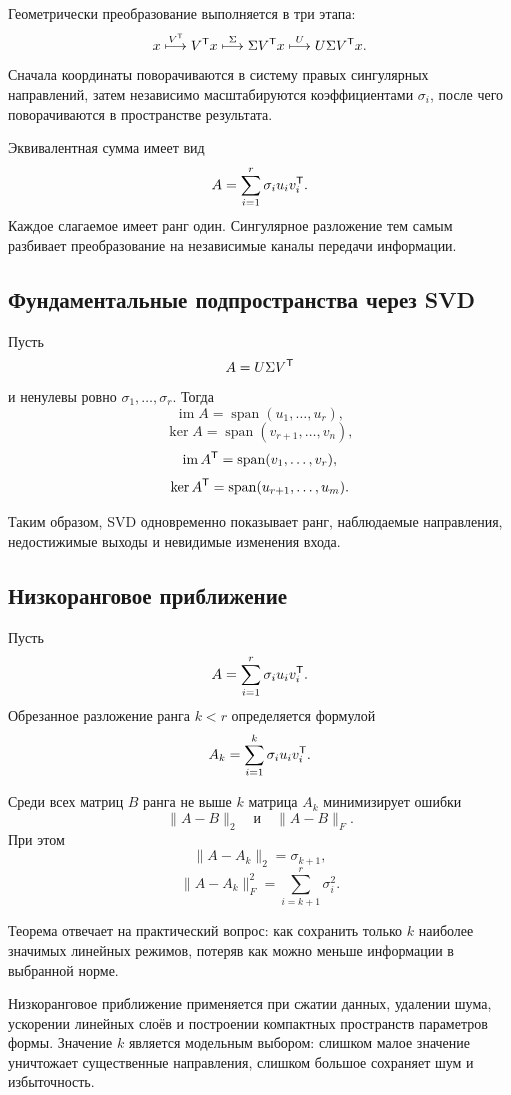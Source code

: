 Геометрически преобразование выполняется в три этапа:
\[
x
\overset{V^{\mathsf{T}}}{\longmapsto}
V^{\mathsf{T}}x
\overset{\Sigma}{\longmapsto}
\Sigma V^{\mathsf{T}}x
\overset{U}{\longmapsto}
U\Sigma V^{\mathsf{T}}x.
\]
Сначала координаты поворачиваются в систему правых сингулярных направлений, затем независимо масштабируются коэффициентами \(\sigma_i\), после чего поворачиваются в пространстве результата.

Эквивалентная сумма имеет вид
\[
A
=
\sum_{i=1}^{r}\sigma_i u_i v_i^{\mathsf{T}}.
\]
Каждое слагаемое имеет ранг один. Сингулярное разложение тем самым разбивает преобразование на независимые каналы передачи информации.

\subsection{Фундаментальные подпространства через SVD}

Пусть
\[
A=U\Sigma V^{\mathsf{T}}
\]
и ненулевы ровно \(\sigma_1,\dots,\sigma_r\). Тогда
\[
\operatorname{im}A
=
\operatorname{span}(u_1,\dots,u_r),
\]
\[
\ker A
=
\operatorname{span}(v_{r+1},\dots,v_n),
\]
\[
\operatorname{im}A^{\mathsf{T}}
=
\operatorname{span}(v_1,\dots,v_r),
\]
\[
\ker A^{\mathsf{T}}
=
\operatorname{span}(u_{r+1},\dots,u_m).
\]

Таким образом, SVD одновременно показывает ранг, наблюдаемые направления, недостижимые выходы и невидимые изменения входа.

\subsection{Низкоранговое приближение}

Пусть
\[
A=\sum_{i=1}^{r}\sigma_i u_i v_i^{\mathsf{T}}.
\]
Обрезанное разложение ранга \(k<r\) определяется формулой
\[
A_k
=
\sum_{i=1}^{k}\sigma_i u_i v_i^{\mathsf{T}}.
\]

\begin{theorem}
Среди всех матриц \(B\) ранга не выше \(k\) матрица \(A_k\) минимизирует ошибки
\[
\|A-B\|_2
\quad\text{и}\quad
\|A-B\|_F.
\]
При этом
\[
\|A-A_k\|_2=\sigma_{k+1},
\]
\[
\|A-A_k\|_F^2
=
\sum_{i=k+1}^{r}\sigma_i^2.
\]
\end{theorem}

Теорема отвечает на практический вопрос: как сохранить только \(k\) наиболее значимых линейных режимов, потеряв как можно меньше информации в выбранной норме.

Низкоранговое приближение применяется при сжатии данных, удалении шума, ускорении линейных слоёв и построении компактных пространств параметров формы. Значение \(k\) является модельным выбором: слишком малое значение уничтожает существенные направления, слишком большое сохраняет шум и избыточность.

